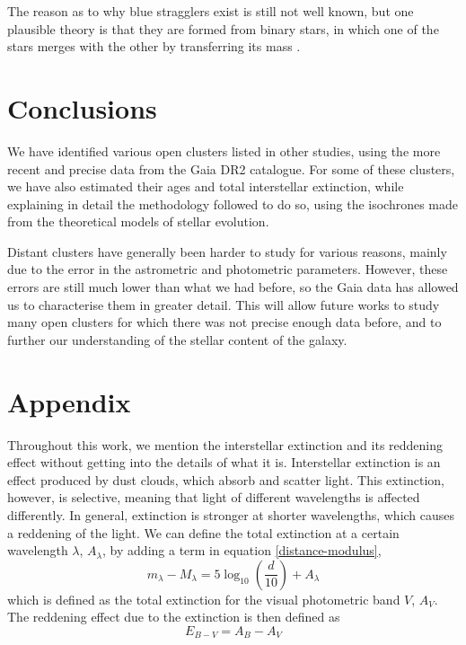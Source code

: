 \documentclass[twocolumn]{revtex4}
\begin{document}
The reason as to why blue stragglers exist is still not well known, but one plausible theory is that they are formed from binary stars, in which one of the stars merges with the other by transferring its mass \cite{stragglers}.


\section{Conclusions}
We have identified various open clusters listed in other studies, using the more recent and precise data from the Gaia DR2 catalogue. For some of these clusters, we have also estimated their ages and total interstellar extinction, while explaining in detail the methodology followed to do so, using the isochrones made from the theoretical models of stellar evolution.

Distant clusters have generally been harder to study for various reasons, mainly due to the error in the astrometric and photometric parameters. However, these errors are still much lower than what we had before, so the Gaia data has allowed us to characterise them in greater detail. This will allow future works to study many open clusters for which there was not precise enough data before, and to further our understanding of the stellar content of the galaxy.

\section{Appendix}
Throughout this work, we mention the interstellar extinction and its reddening effect without getting into the details of what it is. Interstellar extinction is an effect produced by dust clouds, which absorb and scatter light. This extinction, however, is selective, meaning that light of different wavelengths is affected differently. In general, extinction is stronger at shorter wavelengths, which causes a reddening of the light. We can define the total extinction at a certain wavelength $\lambda$, $A_\lambda$, by adding a term in equation \ref{distance-modulus},
\begin{equation}
m_\lambda - M_\lambda = 5 \log_{10} \left( \frac{d}{10} \right) + A_\lambda
\end{equation}
which is defined as the total extinction for the visual photometric band $V$, $A_V$. The reddening effect due to the extinction is then defined as
\begin{equation}
E_{B-V} = A_B - A_V
\end{equation}
\end{document}
